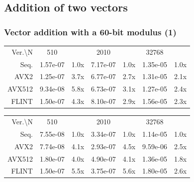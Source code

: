 \documentclass[10pt]{beamer}
\begin{document}
\subsection{Addition of two vectors}
\begin{frame}
    \frametitle{Vector addition with a 60-bit modulus (1)}

    \begin{table}[h!]
        \centering
        
        \begin{tabular}{|r|*{3}{c c|}}
            \hline
            \rowcolor{myGray} 
            \multicolumn{7}{|c|}{\textsc{Cascade Lake}} \\
            \hline
            \rowcolor{myGray}
            Ver.\textbackslash N & 510 & & 2010 & & 32768 & \\
            \hline
            \cellcolor{myGray} Seq. & 1.57e-07 & 1.0x & 7.17e-07 & 1.0x & 1.35e-05 & 1.0x \\
            \hline
            \cellcolor{myGray} AVX2 & 1.25e-07 & 3.7x & 6.77e-07 & 2.7x & 1.31e-05 & 2.1x \\
            \hline
            \cellcolor{myGray} AVX512 & 9.34e-08 & 5.8x & 6.73e-07 & 3.1x & 1.27e-05 & 2.4x \\
            \hline
            \cellcolor{myGray} FLINT & 1.50e-07 & 4.3x & 8.10e-07 & 2.9x & 1.56e-05 & 2.3x \\
            \hline
        \end{tabular}
    
        \begin{tabular}{|r|*{3}{c c|}}
            \hline
            \rowcolor{myGray} 
            \multicolumn{7}{|c|}{\textsc{Ice Lake}} \\
            \hline
            \rowcolor{myGray}
            Ver.\textbackslash N & 510 & & 2010 & & 32768 & \\
            \hline
            \cellcolor{myGray} Seq. & 7.55e-08 & 1.0x & 3.34e-07 & 1.0x & 1.14e-05 & 1.0x \\
            \hline
            \cellcolor{myGray} AVX2 & 7.74e-08 & 4.1x & 2.93e-07 & 4.5x & 9.59e-06 & 2.5x \\
            \hline
            \cellcolor{myGray} AVX512 & 1.80e-07 & 4.0x & 4.90e-07 & 4.1x & 1.36e-05 & 1.8x \\
            \hline
            \cellcolor{myGray} FLINT & 1.50e-07 & 5.5x & 3.75e-07 & 5.6x & 1.80e-05 & 2.6x \\
            \hline
        \end{tabular}
    

\end{table}
\end{frame}
\end{document}
